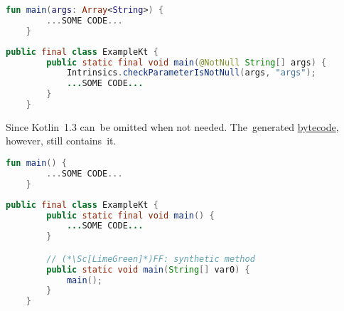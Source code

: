 \begin{lstlisting}[language=Kotlin,title={A~standalone main function in a~file \textit{Example.kt}}]
    fun main(args: Array<String>) {
        ...SOME CODE...
    }
\end{lstlisting}

\begin{lstlisting}[language=Java,title={Corresponding Java code}]
    public final class ExampleKt {
        public static final void main(@NotNull String[] args) {
            Intrinsics.checkParameterIsNotNull(args, "args");
            ...SOME CODE...
        }
    }
\end{lstlisting}

\noindent Since Kotlin~1.3  can~be omitted when not needed.
The~generated \hyperref[javabytecode]{bytecode}, however, still contains~it.

\begin{lstlisting}[language=Kotlin,title={A~tandalone main function without \mbit{args}}]
    fun main() {
        ...SOME CODE...
    }
\end{lstlisting}

\begin{lstlisting}[language=Java,title={Corresponding Java code}]
    public final class ExampleKt {
        public static final void main() {
            ...SOME CODE...
        }

        // (*\Sc[LimeGreen]*)FF: synthetic method
        public static void main(String[] var0) {
            main();
        }
    }
\end{lstlisting}
